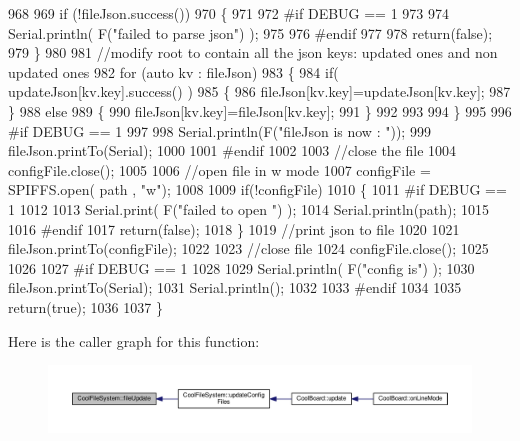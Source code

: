 \begin{DoxyCode}
968 
969     \textcolor{keywordflow}{if} (!fileJson.success())
970     \{
971 
972 \textcolor{preprocessor}{    #if DEBUG == 1}
973 
974         Serial.println( F(\textcolor{stringliteral}{"failed to parse json"}) );
975 
976 \textcolor{preprocessor}{    #endif}
977 
978         \textcolor{keywordflow}{return}(\textcolor{keyword}{false});
979     \}
980     
981     \textcolor{comment}{//modify root to contain all the json keys: updated ones and non updated ones}
982     \textcolor{keywordflow}{for} (\textcolor{keyword}{auto} kv : fileJson) 
983     \{
984         \textcolor{keywordflow}{if}( updateJson[kv.key].success() )
985         \{
986             fileJson[kv.key]=updateJson[kv.key];            
987         \}
988         \textcolor{keywordflow}{else}
989         \{
990             fileJson[kv.key]=fileJson[kv.key];
991         \}
992 
993                 
994     \}
995 
996 \textcolor{preprocessor}{#if DEBUG == 1}
997 
998     Serial.println(F(\textcolor{stringliteral}{"fileJson is now : "}));
999     fileJson.printTo(Serial);
1000 
1001 \textcolor{preprocessor}{#endif}
1002 
1003     \textcolor{comment}{//close the file}
1004     configFile.close();
1005 
1006     \textcolor{comment}{//open file in w mode}
1007     configFile = SPIFFS.open( path , \textcolor{stringliteral}{"w"});
1008     
1009     \textcolor{keywordflow}{if}(!configFile)
1010     \{   
1011 \textcolor{preprocessor}{    #if DEBUG == 1}
1012         
1013         Serial.print( F(\textcolor{stringliteral}{"failed to open "}) );
1014         Serial.println(path);
1015 
1016 \textcolor{preprocessor}{    #endif}
1017         \textcolor{keywordflow}{return}(\textcolor{keyword}{false});
1018     \}
1019     \textcolor{comment}{//print json to file    }
1020     
1021     fileJson.printTo(configFile);
1022     
1023     \textcolor{comment}{//close file}
1024     configFile.close();
1025 
1026 
1027 \textcolor{preprocessor}{#if DEBUG == 1}
1028 
1029     Serial.println( F(\textcolor{stringliteral}{"config is"}) );
1030     fileJson.printTo(Serial);
1031     Serial.println();
1032 
1033 \textcolor{preprocessor}{#endif}
1034     
1035     \textcolor{keywordflow}{return}(\textcolor{keyword}{true});
1036     
1037 \}
\end{DoxyCode}
Here is the caller graph for this function\+:\nopagebreak
\begin{figure}[H]
\begin{center}
\leavevmode
\includegraphics[width=350pt]{classCoolFileSystem_a13f2958f5b87757c31fc53797a30d23a_icgraph}
\end{center}
\end{figure}
\mbox{\label{classCoolFileSystem_a5c58bca3735c0ed3efb268d70ef998ef}} 
